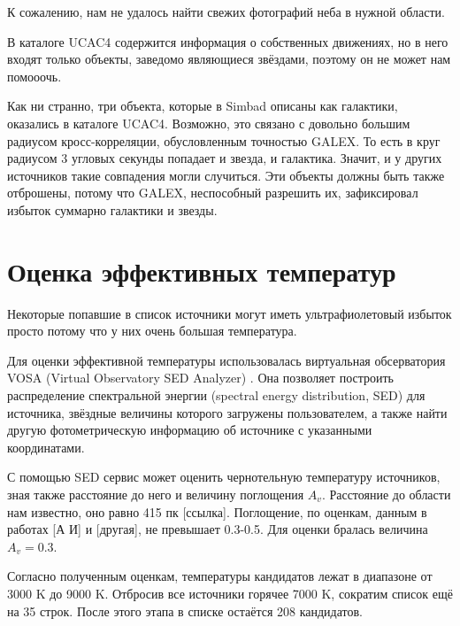 К сожалению, нам не удалось найти свежих фотографий неба в нужной области. 

В каталоге UCAC4 содержится информация о собственных движениях, но в него входят только объекты, заведомо являющиеся звёздами, поэтому он не может нам помооочь.

Как ни странно, три объекта, которые в Simbad описаны как галактики, оказались в каталоге UCAC4. Возможно, это связано с довольно большим радиусом кросс-корреляции, обусловленным точностью GALEX. То есть в круг радиусом 3 угловых секунды попадает и звезда, и галактика. Значит, и у других источников такие совпадения могли случиться. Эти объекты должны быть также отброшены, потому что GALEX, неспособный разрешить их, зафиксировал избыток суммарно галактики и звезды.

\section{Оценка эффективных температур}
Некоторые попавшие в список источники могут иметь ультрафиолетовый избыток просто потому что у них очень большая температура. 

Для оценки эффективной температуры использовалась виртуальная обсерватория VOSA (Virtual Observatory SED Analyzer) \cite{bayo2008vosa}. Она позволяет построить распределение спектральной энергии (spectral energy distribution, SED) для источника, звёздные величины которого загружены пользователем, а также найти другую фотометрическую информацию об источнике с указанными координатами.

С помощью SED сервис может оценить чернотельную температуру источников, зная также расстояние до него и величину поглощения $A_v$. Расстояние до области нам известно, оно равно 415 пк [ссылка]. Поглощение, по оценкам, данным в работах [А И] и [другая], не превышает 0.3-0.5. Для оценки бралась величина $A_v=0.3$.

Согласно полученным оценкам, температуры кандидатов лежат в диапазоне от 3000 K до 9000 K. Отбросив все источники горячее 7000 K, сократим список ещё на 35 строк. После этого этапа в списке остаётся 208 кандидатов.


